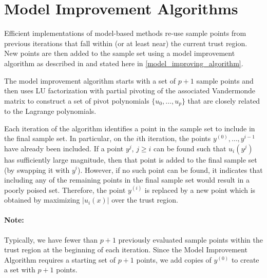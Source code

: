 




\section{Model Improvement Algorithms}

Efficient implementations of model-based methods re-use sample points from previous iterations that fall within (or at least near) the current trust region.
New points are then added to the sample set using a model improvement algorithm as described in 
\cite{introduction_book}  and stated here in \cref{model_improving_algorithm}.

The model improvement algorithm starts with a set of $p+1$ sample points and then uses LU factorization with partial pivoting of the 
associated Vandermonde matrix to construct a set of pivot polynomials $\{u_0, \ldots, u_p\}$ that are closely related to the Lagrange polynomials.  

Each iteration of the algorithm identifies a point in the sample set to include in the final sample set.
In particular, on the $i$th iteration, the points $y^{(0)}, \ldots, y^{i-1}$ have already been included.
If a point $y^j$, $j \ge i$ can be found such that $u_i(y^j)$ has sufficiently large magnitude, 
then that point is added to the final sample set (by swapping it with $y^{i}$).
However, if no such point can be found, it indicates that including any of the remaining points in the final sample set would result in a poorly poised set.
Therefore, the point $y^{(i)}$ is replaced by a new point which is obtained by maximizing $|u_i(x)|$ over the trust region.

\paragraph*{Note:}  Typically, we have fewer than $p+1$ previously evaluated sample points within the trust region at the beginning of each iteration.
Since the Model Improvement Algorithm requires a starting set of $p+1$ points, we add copies of $y^{(0)}$ to create a set with $p+1$ points.

